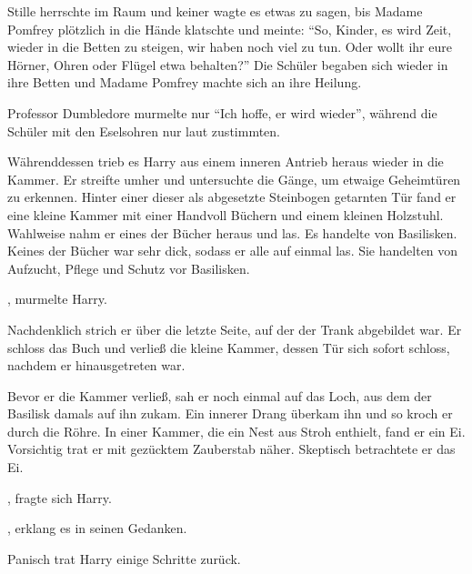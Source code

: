 Stille herrschte im Raum und keiner wagte es etwas zu sagen, bis Madame Pomfrey plötzlich in die Hände klatschte und meinte: \enquote{So, Kinder, es wird Zeit, wieder in die Betten zu steigen, wir haben noch viel zu tun. Oder wollt ihr eure Hörner, Ohren oder Flügel etwa behalten?} Die Schüler begaben sich wieder in ihre Betten und Madame Pomfrey machte sich an ihre Heilung.

Professor Dumbledore murmelte nur \enquote{Ich hoffe, er wird wieder}, während die Schüler mit den Eselsohren nur laut zustimmten.

Währenddessen trieb es Harry aus einem inneren Antrieb heraus wieder in die Kammer. Er streifte umher und untersuchte die Gänge, um etwaige Geheimtüren zu erkennen. Hinter einer dieser als abgesetzte Steinbogen getarnten Tür fand er eine kleine Kammer mit einer Handvoll Büchern und einem kleinen Holzstuhl. Wahlweise nahm er eines der Bücher heraus und las. Es handelte von Basilisken. Keines der Bücher war sehr dick, sodass er alle auf einmal las. Sie handelten von Aufzucht, Pflege und Schutz vor Basilisken.

, murmelte Harry. 

Nachdenklich strich er über die letzte Seite, auf der der Trank abgebildet war. Er schloss das Buch und verließ die kleine Kammer, dessen Tür sich sofort schloss, nachdem er hinausgetreten war.

Bevor er die Kammer verließ, sah er noch einmal auf das Loch, aus dem der Basilisk damals auf ihn zukam. Ein innerer Drang überkam ihn und so kroch er durch die Röhre. In einer Kammer, die ein Nest aus Stroh enthielt, fand er ein Ei. Vorsichtig trat er mit gezücktem Zauberstab näher. Skeptisch betrachtete er das Ei.

, fragte sich Harry.

, erklang es in seinen Gedanken. 

Panisch trat Harry einige Schritte zurück.


